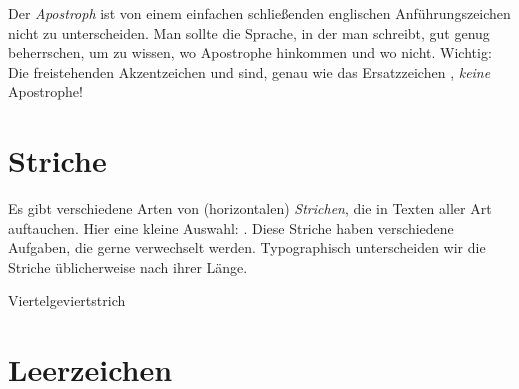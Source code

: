 Der \emph{Apostroph}  ist von einem einfachen schließenden englischen
Anführungszeichen nicht zu unterscheiden.  Man sollte die Sprache, in der
man schreibt, gut genug beherrschen, um zu wissen, wo Apostrophe hinkommen und
wo nicht.  Wichtig: Die freistehenden Akzentzeichen
\Char{\textasciigrave} und  sind, genau wie das Ersatzzeichen
\Char{\textquotesingle}, \emph{keine} Apostrophe!


\section{Striche}

Es gibt verschiedene Arten von (horizontalen) \emph{Strichen}, die in
Texten aller Art auftauchen.  Hier eine kleine Auswahl:
\Char{-\,--\,---\,$-$\,$=$}.  Diese Striche haben verschiedene
Aufgaben, die gerne verwechselt werden.  Typographisch unterscheiden
wir die Striche üblicherweise nach ihrer Länge.

\begin{description}
\item[Viertelgeviertstrich]
\end{description}

\section{Leerzeichen}

